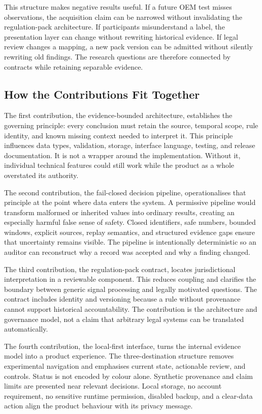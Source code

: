 This structure makes negative results useful. If a future OEM test misses observations, the acquisition claim can be narrowed without invalidating the regulation-pack architecture. If participants misunderstand a label, the presentation layer can change without rewriting historical evidence. If legal review changes a mapping, a new pack version can be admitted without silently rewriting old findings. The research questions are therefore connected by contracts while retaining separable evidence.

\subsection{How the Contributions Fit Together}

The first contribution, the evidence-bounded architecture, establishes the governing principle: every conclusion must retain the source, temporal scope, rule identity, and known missing context needed to interpret it. This principle influences data types, validation, storage, interface language, testing, and release documentation. It is not a wrapper around the implementation. Without it, individual technical features could still work while the product as a whole overstated its authority.

The second contribution, the fail-closed decision pipeline, operationalises that principle at the point where data enters the system. A permissive pipeline would transform malformed or inherited values into ordinary results, creating an especially harmful false sense of safety. Closed identifiers, safe numbers, bounded windows, explicit sources, replay semantics, and structured evidence gaps ensure that uncertainty remains visible. The pipeline is intentionally deterministic so an auditor can reconstruct why a record was accepted and why a finding changed.

The third contribution, the regulation-pack contract, locates jurisdictional interpretation in a reviewable component. This reduces coupling and clarifies the boundary between generic signal processing and legally motivated questions. The contract includes identity and versioning because a rule without provenance cannot support historical accountability. The contribution is the architecture and governance model, not a claim that arbitrary legal systems can be translated automatically.

The fourth contribution, the local-first interface, turns the internal evidence model into a product experience. The three-destination structure removes experimental navigation and emphasises current state, actionable review, and controls. Status is not encoded by colour alone. Synthetic provenance and claim limits are presented near relevant decisions. Local storage, no account requirement, no sensitive runtime permission, disabled backup, and a clear-data action align the product behaviour with its privacy message.

